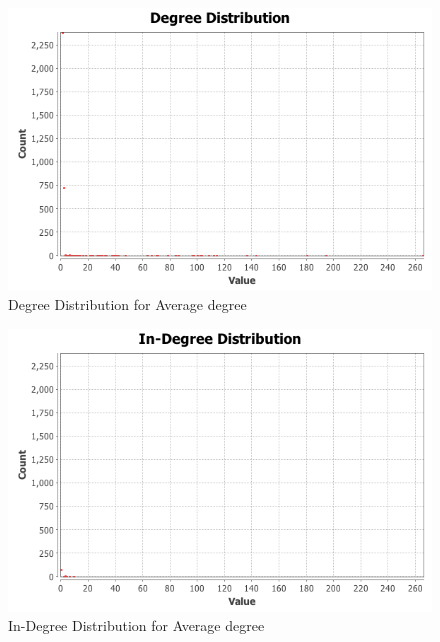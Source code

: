 \begin{figure}[!ht]    
    \begin{center}
        \includegraphics[scale=0.60]{q3/AverageDegree/degree-distribution.png}
        \caption{Degree Distribution for Average 
        degree}
        \label{fig:q3-7}
    \end{center}
\end{figure}
\begin{figure}[!ht]    
    \begin{center}
        \includegraphics[scale=0.60]{q3/AverageDegree/indegree-distribution.png}
        \caption{In-Degree Distribution for Average 
        degree}
        \label{fig:q3-8}
    \end{center}
\end{figure}
